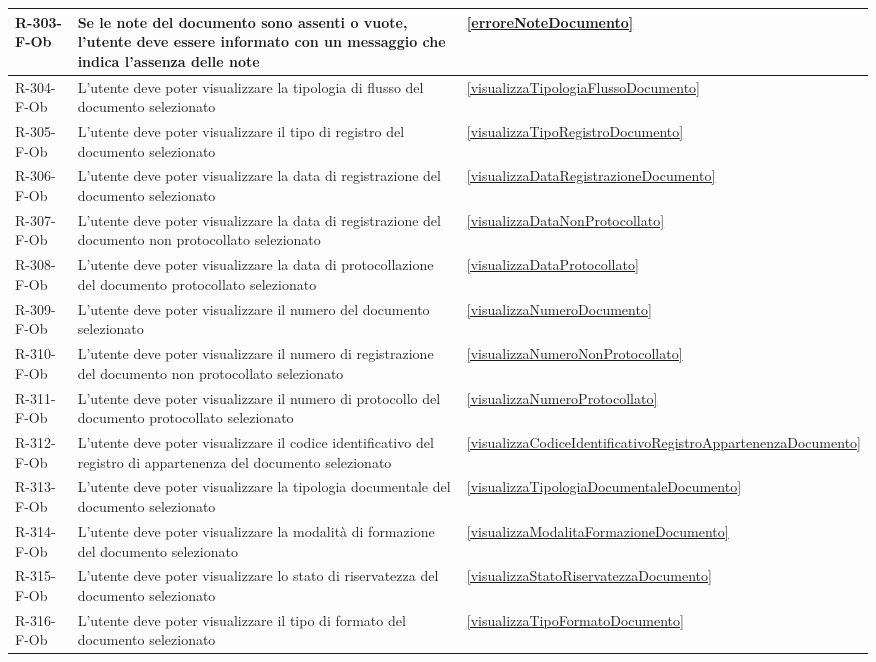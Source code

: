 \begin{longtable}{|p{2.5cm}|p{9.5cm}|p{2.5cm}|}
\hline
R-303-F-Ob & Se le note del documento sono assenti o vuote, l'utente deve essere informato con un messaggio che indica l'assenza delle note & \ref{erroreNoteDocumento} \\
\hline
R-304-F-Ob & L'utente deve poter visualizzare la tipologia di flusso del documento selezionato & \ref{visualizzaTipologiaFlussoDocumento} \\
\hline
R-305-F-Ob & L'utente deve poter visualizzare il tipo di registro del documento selezionato & \ref{visualizzaTipoRegistroDocumento} \\
\hline
R-306-F-Ob & L'utente deve poter visualizzare la data di registrazione del documento selezionato & \ref{visualizzaDataRegistrazioneDocumento} \\
\hline
R-307-F-Ob & L'utente deve poter visualizzare la data di registrazione del documento non protocollato selezionato & \ref{visualizzaDataNonProtocollato} \\
\hline
R-308-F-Ob & L'utente deve poter visualizzare la data di protocollazione del documento protocollato selezionato & \ref{visualizzaDataProtocollato} \\
\hline
R-309-F-Ob & L'utente deve poter visualizzare il numero del documento selezionato & \ref{visualizzaNumeroDocumento} \\
\hline
R-310-F-Ob & L'utente deve poter visualizzare il numero di registrazione del documento non protocollato selezionato & \ref{visualizzaNumeroNonProtocollato} \\
\hline
R-311-F-Ob & L'utente deve poter visualizzare il numero di protocollo del documento protocollato selezionato & \ref{visualizzaNumeroProtocollato} \\
\hline
R-312-F-Ob & L'utente deve poter visualizzare il codice identificativo del registro di appartenenza del documento selezionato & \ref{visualizzaCodiceIdentificativoRegistroAppartenenzaDocumento} \\
\hline
R-313-F-Ob & L'utente deve poter visualizzare la tipologia documentale del documento selezionato & \ref{visualizzaTipologiaDocumentaleDocumento} \\
\hline
R-314-F-Ob & L'utente deve poter visualizzare la modalità di formazione del documento selezionato & \ref{visualizzaModalitaFormazioneDocumento} \\
\hline
R-315-F-Ob & L'utente deve poter visualizzare lo stato di riservatezza del documento selezionato & \ref{visualizzaStatoRiservatezzaDocumento} \\
\hline
R-316-F-Ob & L'utente deve poter visualizzare il tipo di formato del documento selezionato & \ref{visualizzaTipoFormatoDocumento} \\

\end{longtable}
